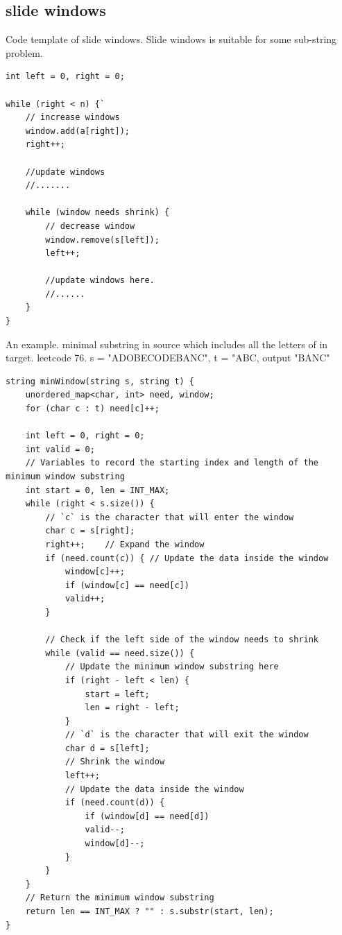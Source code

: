 \documentclass[a4paper,11pt,twoside]{book}
\begin{document}
\subsection{slide windows}

	\par Code template of slide windows. Slide windows is suitable for some sub-string problem. 

\begin{lstlisting}[breaklines]
int left = 0, right = 0;

while (right < n) {`
	// increase windows
	window.add(a[right]);
	right++;
	
	//update windows
	//.......
	
	while (window needs shrink) {
		// decrease window
		window.remove(s[left]);
		left++;
		
		//update windows here.
		//......
	}
}			
\end{lstlisting}

	\par An example. minimal substring in source which includes all the letters of in target. leetcode 76.
	s = "ADOBECODEBANC", t = "ABC, output "BANC"
\begin{lstlisting}
string minWindow(string s, string t) { 
	unordered_map<char, int> need, window;
	for (char c : t) need[c]++;
	
	int left = 0, right = 0;
	int valid = 0;
	// Variables to record the starting index and length of the minimum window substring
	int start = 0, len = INT_MAX;
	while (right < s.size()) {
		// `c` is the character that will enter the window
		char c = s[right];
		right++; 	// Expand the window
		if (need.count(c)) { // Update the data inside the window
			window[c]++;
			if (window[c] == need[c])
			valid++;
		}
		
		// Check if the left side of the window needs to shrink
		while (valid == need.size()) {
			// Update the minimum window substring here
			if (right - left < len) {
				start = left;
				len = right - left;
			}
			// `d` is the character that will exit the window
			char d = s[left];
			// Shrink the window
			left++;
			// Update the data inside the window
			if (need.count(d)) {
				if (window[d] == need[d])
				valid--;
				window[d]--;
			}                    
		}
	}
	// Return the minimum window substring
	return len == INT_MAX ? "" : s.substr(start, len);
}
\end{lstlisting}
\end{document}
